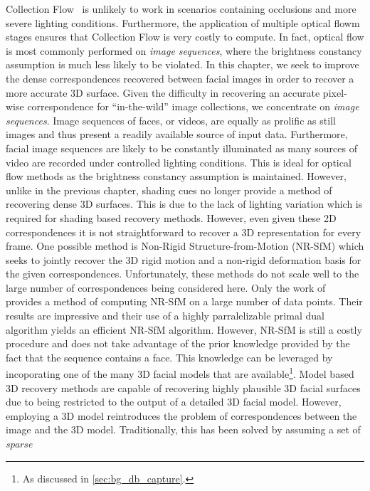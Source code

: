 Collection Flow~\cite{kemelmacher2012collection} is unlikely to work in
scenarios containing occlusions and more severe lighting conditions.
Furthermore, the application of multiple optical flowm stages ensures that Collection
Flow is very costly to compute. In fact, optical flow is most commonly performed
on \textit{image sequences}, where the brightness constancy assumption is
much less likely to be violated. In this chapter, we seek to improve the dense
correspondences recovered between facial images in order to recover a more
accurate 3D surface. Given the difficulty in recovering an accurate pixel-wise
correspondence for ``in-the-wild'' image collections, we concentrate on
\textit{image sequences}. Image sequences of faces, or videos, are equally
as prolific as still images and thus present a readily available source of
input data. Furthermore, facial image sequences are likely to be constantly
illuminated as many sources of video are recorded under controlled lighting
conditions. This is ideal for optical flow methods as the brightness constancy
assumption is maintained. However, unlike in the previous chapter, shading cues
no longer provide a method of recovering dense 3D surfaces. This is due
to the lack of lighting variation which is required for shading based
recovery methods. However, even given these 2D correspondences it is not
straightforward to recover a 3D representation for every frame. One possible
method is Non-Rigid Structure-from-Motion (NR-SfM) which seeks to jointly
recover the 3D rigid motion and a non-rigid deformation basis for the given
correspondences. Unfortunately, these methods do not scale well to the large number
of correspondences being considered here. Only the work of \citet{garg2013dense}
provides a method of computing NR-SfM on a large number of data points. Their 
results are impressive and their use of a highly parralelizable primal
dual algorithm yields an efficient NR-SfM algorithm. However, NR-SfM is still
a costly procedure and does not take advantage of the prior knowledge provided
by the fact that the sequence contains a face. This knowledge can be leveraged
by incoporating one of the many 3D facial models that are available\footnote{As
discussed in \cref{sec:bg_db_capture}.}. Model based 3D recovery methods
are capable of recovering highly plausible 3D facial surfaces due to being
restricted to the output of a detailed 3D facial model. However, employing a 3D model
reintroduces the problem of correspondences between the image and the 3D model.
Traditionally, this has been solved by assuming a set of \textit{sparse}
